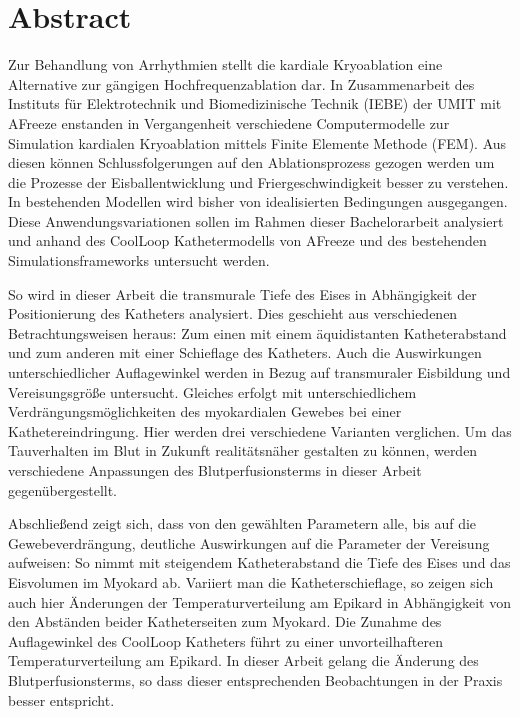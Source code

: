 \chapter*{Abstract}
\label{sec:abstract}
Zur Behandlung von Arrhythmien stellt die kardiale Kryoablation eine Alternative zur gängigen Hochfrequenzablation dar. In Zusammenarbeit des Instituts für Elektrotechnik und Biomedizinische Technik (IEBE) der UMIT mit AFreeze enstanden in Vergangenheit verschiedene Computermodelle zur Simulation kardialen Kryoablation mittels Finite Elemente Methode (FEM). Aus diesen können Schlussfolgerungen auf den Ablationsprozess gezogen werden um die Prozesse der Eisballentwicklung und Friergeschwindigkeit besser zu verstehen. In bestehenden Modellen wird bisher von idealisierten Bedingungen ausgegangen. Diese Anwendungsvariationen sollen im Rahmen dieser Bachelorarbeit analysiert und anhand des CoolLoop\SymbReg{} Kathetermodells von AFreeze und des bestehenden Simulationsframeworks untersucht werden. 

So wird in dieser Arbeit die transmurale Tiefe des Eises in Abhängigkeit der Positionierung des Katheters analysiert. Dies geschieht aus verschiedenen Betrachtungsweisen heraus: Zum einen mit einem äquidistanten Katheterabstand und zum anderen mit einer Schieflage des Katheters. Auch die Auswirkungen unterschiedlicher Auflagewinkel werden in Bezug auf transmuraler Eisbildung und Vereisungsgröße untersucht. Gleiches erfolgt mit unterschiedlichem Verdrängungsmöglichkeiten des myokardialen Gewebes bei einer Kathetereindringung. Hier werden drei verschiedene Varianten verglichen. Um das Tauverhalten im Blut in Zukunft realitätsnäher gestalten zu können, werden verschiedene Anpassungen des Blutperfusionsterms in dieser Arbeit gegenübergestellt.

Abschließend zeigt sich, dass von den gewählten Parametern alle, bis auf die Gewebeverdrängung, deutliche Auswirkungen auf die Parameter der Vereisung aufweisen:
So nimmt mit steigendem Katheterabstand die Tiefe des Eises und das Eisvolumen im Myokard ab. Variiert man die Katheterschieflage, so zeigen sich auch hier Änderungen der Temperaturverteilung am Epikard in Abhängigkeit von den Abständen beider Katheterseiten zum Myokard. Die Zunahme des Auflagewinkel des CoolLoop\SymbReg{} Katheters führt zu einer unvorteilhafteren Temperaturverteilung am Epikard. In dieser Arbeit gelang die Änderung des Blutperfusionsterms, so dass dieser entsprechenden Beobachtungen in der Praxis besser entspricht.